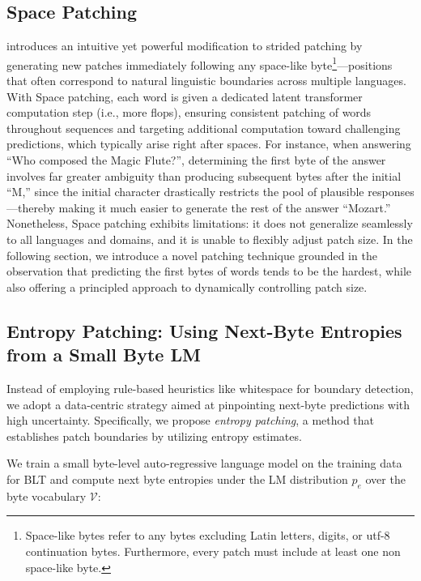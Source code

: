 \subsection{Space Patching}
\label{section:white-patch}

\citet{slagle2024spacebyte} introduces an intuitive yet powerful modification to strided patching by generating new patches immediately following any space-like byte\footnote{
    Space-like bytes refer to any bytes excluding Latin letters, digits, or utf-8 continuation bytes. Furthermore, every patch must include at least one non space-like byte.
}—positions that often correspond to natural linguistic boundaries across multiple languages. With Space patching, each word is given a dedicated latent transformer computation step (i.e., more flops), ensuring consistent patching of words throughout sequences and targeting additional computation toward challenging predictions, which typically arise right after spaces. For instance, when answering “Who composed the Magic Flute?\uline{\hspace{.6em}}”, determining the first byte of the answer involves far greater ambiguity than producing subsequent bytes after the initial “M,” since the initial character drastically restricts the pool of plausible responses—thereby making it much easier to generate the rest of the answer “Mozart.” Nonetheless, Space patching exhibits limitations: it does not generalize seamlessly to all languages and domains, and it is unable to flexibly adjust patch size. In the following section, we introduce a novel patching technique grounded in the observation that predicting the first bytes of words tends to be the hardest, while also offering a principled approach to dynamically controlling patch size.

\subsection{Entropy Patching: Using Next-Byte Entropies from a Small Byte LM}
\label{section:dyn-patch}

Instead of employing rule-based heuristics like whitespace for boundary detection, we adopt a data-centric strategy aimed at pinpointing next-byte predictions with high uncertainty. Specifically, we propose \textit{entropy patching}, a method that establishes patch boundaries by utilizing entropy estimates.

We train a small byte-level auto-regressive language model on the training data for {\textsc BLT} and compute next byte entropies under the LM distribution $p_{e}$ over the byte vocabulary $\mathcal{V}$:

